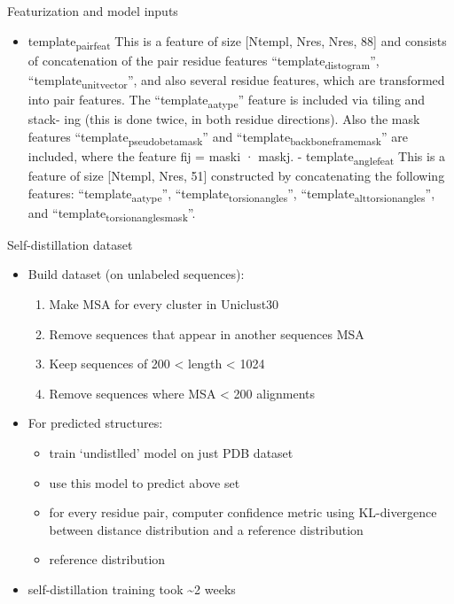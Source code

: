 \documentclass[presentation, smaller]{beamer}
\begin{document}
\begin{frame}[label={sec:org791e45a}]{Featurization and model inputs}
\begin{itemize}
\item \alert{template\textsubscript{pair}\textsubscript{feat}}
This is a feature of size [Ntempl, Nres, Nres, 88] and consists of concatenation of the pair residue features “template\textsubscript{distogram}”, “template\textsubscript{unit}\textsubscript{vector}”, and also several residue features, which are transformed into pair features. The “template\textsubscript{aatype}” feature is included via tiling and stack- ing (this is done twice, in both residue directions). Also the mask features “template\textsubscript{pseudo}\textsubscript{beta}\textsubscript{mask}” and “template\textsubscript{backbone}\textsubscript{frame}\textsubscript{mask}” are included, where the feature fij = maski · maskj. - template\textsubscript{angle}\textsubscript{feat} This is a feature of size [Ntempl, Nres, 51] constructed by concatenating the following features: “template\textsubscript{aatype}”, “template\textsubscript{torsion}\textsubscript{angles}”, “template\textsubscript{alt}\textsubscript{torsion}\textsubscript{angles}”, and “template\textsubscript{torsion}\textsubscript{angles}\textsubscript{mask}”. \cite{jumperHighlyAccurateProtein2021}
\end{itemize}
\end{frame}

\begin{frame}[label={sec:orgf031db6}]{Self-distillation dataset}
\begin{itemize}
\item Build dataset (on unlabeled sequences):
\begin{enumerate}
\item Make MSA for every cluster in Uniclust30
\item Remove sequences that appear in another sequences MSA
\item Keep sequences of 200 < length < 1024
\item Remove sequences where MSA < 200 alignments
\end{enumerate}
\item For predicted structures:
\begin{itemize}
\item train `undistlled' model on just PDB dataset
\item use this model to predict above set
\item for every residue pair, computer confidence metric using KL-divergence between distance distribution and a reference distribution
\item reference distribution
\end{itemize}
\item self-distillation training took \textasciitilde{}2 weeks
\end{itemize}~\cite{jumperHighlyAccurateProtein2021}
\end{frame}
\end{document}
